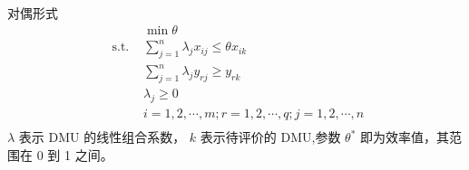 \documentclass[]{beamer}
\begin{document}
\begin{frame}{对偶形式}
    \vskip -0.5cm
    \begin{align*}
        & \min \theta \\
        \text { s.t. } & \sum_{j=1}^n \lambda_j x_{i j} \leq \theta x_{i k} \\
        & \sum_{j=1}^n \lambda_j y_{r j} \geq y_{r k} \\
        & \lambda_{j} \geq 0 \\
        & i=1,2, \cdots, m ; r=1,2, \cdots, q ; j=1,2, \cdots, n \\
    \end{align*}
\vskip -0.5cm    
$\lambda$ 表示 DMU 的线性组合系数， $k$ 表示待评价的 DMU,参数 $\theta^*$ 即为效率值，其范围在 0 到 1 之间。
\end{frame}
\end{document}
